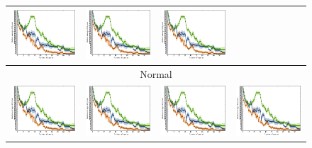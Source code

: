\documentclass{article}
\renewcommand\[{\begin{equation}}
\renewcommand\]{\end{equation}}
\begin{document}
\begin{figure}[b]
{\begin{tabular}{cccc}
        \includegraphics[width=10em]{figures/loss} &
        \includegraphics[width=10em]{figures/loss} &
        \includegraphics[width=10em]{figures/loss}
        \\
        \hline
        \multicolumn{4}{c}{{\sc Normal}}
        \\
        \includegraphics[width=10em]{figures/loss} &
        \includegraphics[width=10em]{figures/loss} &
        \includegraphics[width=10em]{figures/loss} &
        \includegraphics[width=10em]{figures/loss}

\end{tabular}}
\end{figure}
\end{document}
